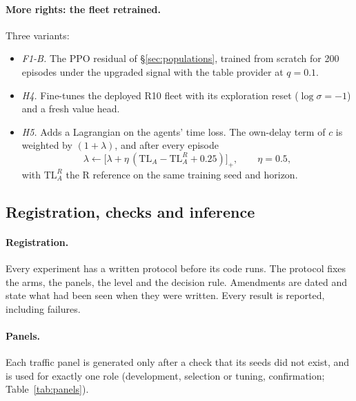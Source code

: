 \documentclass[11pt]{article}
\begin{document}
\paragraph{More rights: the fleet retrained.} Three variants:
\begin{itemize}\setlength\itemsep{1pt}
\item \emph{F1-B.} The PPO residual of §\ref{sec:populations}, trained from scratch for 200 episodes under the upgraded signal with the
table provider at $q=0.1$.
\item \emph{H4.} Fine-tunes the deployed R10 fleet with its exploration reset ($\log\sigma=-1$) and a fresh value head.
\item \emph{H5.} Adds a Lagrangian on the agents' time loss. The own-delay term of $c$ is weighted by $(1+\lambda)$, and after every
episode
\begin{equation}
\lambda\leftarrow\big[\lambda+\eta\,(\mathrm{TL}_A-\mathrm{TL}_A^{R}+0.25)\big]_+,\qquad \eta=0.5,
\end{equation}
with $\mathrm{TL}_A^{R}$ the R reference on the same training seed and horizon.
\end{itemize}

\subsection{Registration, checks and inference}\label{sec:inference}
\paragraph{Registration.} Every experiment has a written protocol before its code runs. The protocol fixes the arms, the panels, the
level and the decision rule. Amendments are dated and state what had been seen when they were written. Every result is reported,
including failures.
\paragraph{Panels.} Each traffic panel is generated only after a check that its seeds did not exist, and is used for exactly one role
(development, selection or tuning, confirmation; Table~\ref{tab:panels}).
\end{document}

